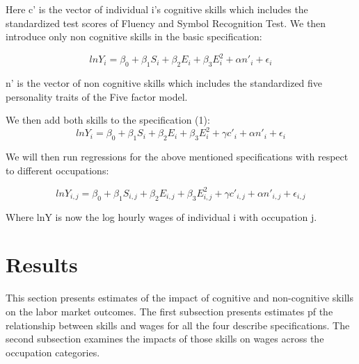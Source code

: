 \documentclass[11pt, a4paper, leqno]{article}
\begin{document}
 Here c' is the vector of individual i’s cognitive skills which includes the standardized test scores of Fluency and Symbol Recognition Test.
 We then introduce only non cognitive skills in the basic specification:
 
  \[lnY_{i} = \beta_{0} + \beta_{1}S_{i} + \beta_{2}E_{i} + \beta_{3}E_{i}^{2} + \alpha n'_{i} \label{eq:noncog}+\epsilon_{i} \tag{3} \]  
  
  n' is the vector of non cognitive skills which includes the standardized  five personality traits of the Five factor model. 
  
  We then add both skills to the specification (1): 
  \[lnY_{i} = \beta_{0} + \beta_{1}S_{i} + \beta_{2}E_{i} + \beta_{3}E_{i}^{2} + \gamma c'_{i} + \alpha n'_{i} +\epsilon_{i}  \label{eq:cog} \tag{4} \]
  
  We will then run regressions for the above mentioned specifications with respect to different occupations:
    
 \[lnY_{i,j} = \beta_{0} + \beta_{1}S_{i,j} + \beta_{2}E_{i,j} + \beta_{3}E_{i,j}^{2} + \gamma c'_{i,j} + \alpha n'_{i,j} +\epsilon_{i,j}  \label{eq:cog} \tag{5} \]
 
 Where lnY is now the log hourly wages of individual i with occupation j. 
 
 \section*{Results}
 This section presents estimates of the impact of cognitive and non-cognitive skills on the labor market outcomes. The first subsection presents estimates pf the relationship between skills and wages for  all the four describe specifications. The second subsection examines the impacts of those skills on wages across the occupation categories. 
\end{document}
